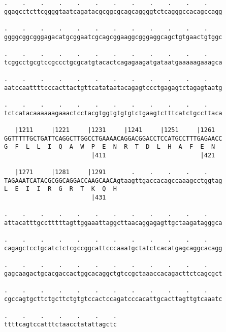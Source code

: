 \documentclass{article}
\begin{document}
\begin{Verbatim}
.    .    .    .    .    .    .    .    .    .    .    .    
ggagcctcttcggggtaatcagatacgcggcgcagcaggggtctcagggccacagccagg
                                                            
.    .    .    .    .    .    .    .    .    .    .    .    
ggggcggcgggagacatgcggaatcgcagcggaaggcgggaggcagctgtgaactgtggc
                                                            
.    .    .    .    .    .    .    .    .    .    .    .    
tcggcctgcgtccgccctgcgcatgtacactcagagaagatgataatgaaaaagaaagca
                                                            
.    .    .    .    .    .    .    .    .    .    .    .    
aatccaattttcccacttactgttcatataatacagagtccctgagagtctagagtaatg
                                                            
.    .    .    .    .    .    .    .    .    .    .    .    
tctcatacaaaaaagaaactcctacgtggtgtgtgtctgaagtctttcatctgccttaca
                                                            
   |1211     |1221     |1231     |1241     |1251     |1261  
GGTTTTTGCTGATTCAGGCTTGGCCTGAAAACAGGACGGACCTCCATGCCTTTGAGAACC
G  F  L  L  I  Q  A  W  P  E  N  R  T  D  L  H  A  F  E  N  
                        |411                          |421  
  
   |1271     |1281     |1291       .    .    .    .    .    
TAGAAATCATACGCGGCAGGACCAAGCAACAgtaagttgaccacagccaaagcctggtag
L  E  I  I  R  G  R  T  K  Q  H                             
                        |431                                
  
.    .    .    .    .    .    .    .    .    .    .    .    
attacatttgcctttttagttggaaattaggcttaacaggagagttgctaagatagggca
                                                            
.    .    .    .    .    .    .    .    .    .    .    .    
cagagctcctgcatctctcgccggcattcccaaatgctatctcacatgagcaggcacagg
                                                            
.    .    .    .    .    .    .    .    .    .    .    .    
gagcaagactgcacgaccactggcacaggctgtccgctaaaccacagacttctcagcgct
                                                            
.    .    .    .    .    .    .    .    .    .    .    .    
cgccagtgcttctgcttctgtgtccactccagatcccacattgcacttagttgtcaaatc
                                                            
.    .    .    .    .    .    .
ttttcagtccatttctaacctatattagctc
                               

\end{Verbatim}
\end{document}
